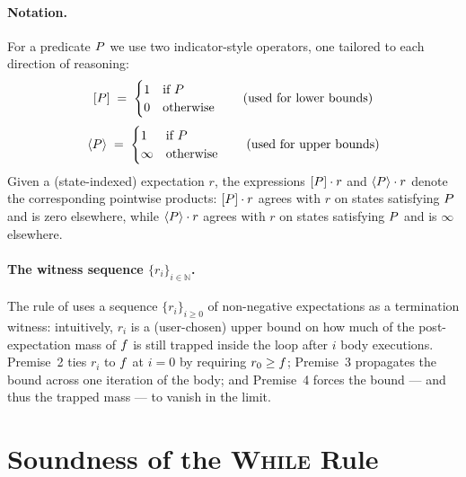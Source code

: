 \documentclass[acmsmall,natbib,review,screen,anonymous,10pt]{acmart}
\begin{document}
\paragraph{Notation.}
For a predicate $P$ we use two indicator-style operators, one tailored to
each direction of reasoning:
\[
  [P] \;=\;
  \begin{cases} 1 & \text{if } P \\ 0 & \text{otherwise} \end{cases}
  \qquad\text{(used for lower bounds)}
  \\[3mm]
\]
\[
  \langle P \rangle \;=\;
  \begin{cases} 1 & \text{if } P \\ \infty & \text{otherwise} \end{cases}
  \qquad\text{(used for upper bounds)}
  \\[3mm]
\]
Given a (state-indexed) expectation $r$, the expressions $[P] \cdot r$ and
$\langle P \rangle \cdot r$ denote the corresponding pointwise products:
$[P] \cdot r$ agrees with $r$ on states satisfying $P$ and is zero
elsewhere, while $\langle P \rangle \cdot r$ agrees with $r$ on states
satisfying $P$ and is $\infty$ elsewhere.

\paragraph{The witness sequence $\{r_i\}_{i \in \mathbb{N}}$.}
The rule of  uses a sequence $\{r_i\}_{i \geq 0}$ of
non-negative expectations as a termination witness: intuitively, $r_i$ is a
(user-chosen) upper bound on how much of the post-expectation mass of $f$ is
still trapped inside the loop after $i$ body executions. Premise~2 ties $r_i$
to $f$ at $i=0$ by requiring $r_0 \geq f$; Premise~3 propagates the bound
across one iteration of the body; and Premise~4 forces the bound --- and thus
the trapped mass --- to vanish in the limit.

\newpage

\appendix

\section{Soundness of the \textsc{While} Rule}\label{app:while-soundness}
\end{document}
